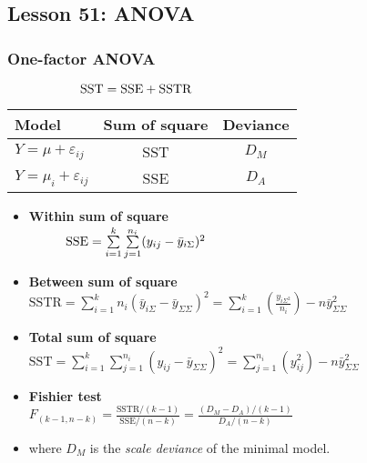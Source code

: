 \documentclass[10pt, french]{article}
\begin{document}
\begin{multicols*}{3}
\section*{Lesson 51: ANOVA}
\subsubsection*{One-factor ANOVA}
$\hspace*{2cm} \mathrm{SST} = \mathrm{SSE} + \mathrm{SSTR}$
   \begin{center}
      \begin{tabular}{lcc}
        \hline
        Model & Sum of square & Deviance \\
        \hline
         $Y = \mu + \varepsilon_{ij}$ & SST & $D_M$ \\
         $Y = \mu_i + \varepsilon_{ij}$ & SSE & $D_A$ \\
         \hline
      \end{tabular}
   \end{center}
\begin{itemize}[align=left,leftmargin=*]
   \item  \textbf{Within sum of square} \\
   $\hspace*{1cm} \mathrm{SSE} = \sum\limits_{i=1}^k \sum\limits_{j=1}^{n_i} (y_{ij} - \bar{y}_{i\Sigma})^2$
   \item \textbf{Between sum of square} \\
   $\mathrm{SSTR} = \sum\limits_{i=1}^k n_i (\bar{y}_{i\Sigma} - \bar{y}_{\Sigma\Sigma})^2 = \sum\limits_{i=1}^k \left(\frac{y_{i\Sigma^2}}{n_i}\right)  - n\bar{y}_{\Sigma\Sigma}^2$
   \item \textbf{Total sum of square} \\
   $\mathrm{SST} = \sum\limits_{i=1}^k \sum\limits_{j=1}^{n_i} (y_{ij} - \bar{y}_{\Sigma\Sigma})^2 = \sum\limits_{j=1}^{n_i} (y_{ij}^2) - n\bar{y}_{\Sigma\Sigma}^2$ \\
   \item \textbf{Fishier test} \\
   $F_{(k-1, n-k)} = \frac{\mathrm{SSTR}/(k-1)}{\mathrm{SSE}/(n-k)} = \frac{(D_M - D_A)/(k-1)}{D_A/(n-k)}$
   \item[] where $D_M$ is the \emph{scale deviance} of the minimal model.
\end{itemize}

\end{multicols*}
\end{document}
